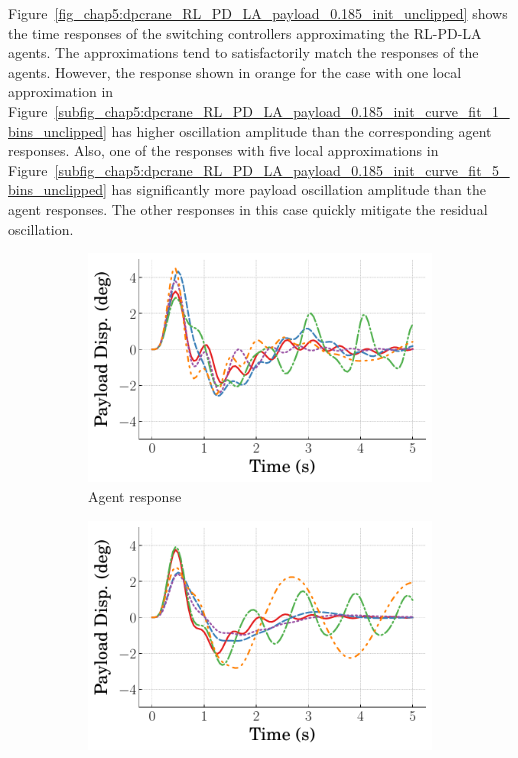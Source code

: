 Figure~\ref{fig_chap5:dpcrane_RL_PD_LA_payload_0.185_init_unclipped} shows the time responses of the switching controllers approximating the RL-PD-LA agents. The approximations tend to satisfactorily match the responses of the agents. However, the response shown in orange for the case with one local approximation in Figure~\ref{subfig_chap5:dpcrane_RL_PD_LA_payload_0.185_init_curve_fit_1_bins_unclipped} has higher oscillation amplitude than the corresponding agent responses. Also, one of the responses with five local approximations in Figure~\ref{subfig_chap5:dpcrane_RL_PD_LA_payload_0.185_init_curve_fit_5_bins_unclipped} has significantly more payload oscillation amplitude than the agent responses. The other responses in this case quickly mitigate the residual oscillation.
%
\begin{figure}
    \centering
    \begin{subfigure}[b]{0.32\textwidth}
        \centering
        \includegraphics[width=\textwidth]{figures/figures_Interpretability/Mean_ISE_dpcrane_cubic_1_bins/curve_fit_time_responses/RL_PD_LA/agent_0p18_Payload_Disp.pdf}
        \caption{Agent response}
        \label{subfig_chap5:dpcrane_RL_PD_LA_payload_0.185_init_agent_unclipped}
    \end{subfigure}
    \hfill
    \begin{subfigure}[b]{0.32\textwidth}
        \centering
        \includegraphics[width=\textwidth]{figures/figures_Interpretability/Mean_ISE_dpcrane_cubic_1_bins/curve_fit_time_responses/RL_PD_LA/curve_fit_0p18_Payload_Disp.pdf}

\end{subfigure}
\end{figure}
